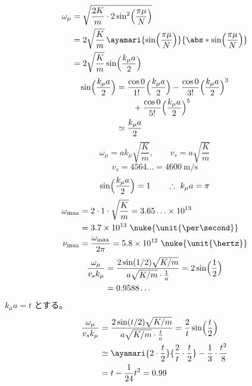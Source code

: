 \begin{align*}
  \omega_\mu&=\sqrt{\frac{2K}{m}\cdot2\sin^{2}\Bigl(\frac{\pi\mu}{N}\Bigr)}\\
  &=2\sqrt{\frac{K}{m}}\,\ayamari{\sin\Bigl(\frac{\pi\mu}{N}\Bigr)}{\abs*{\sin\Bigl(\frac{\pi\mu}{N}\Bigr)}}\\
  &=2\sqrt{\frac{K}{m}}\sin\Bigl(\frac{k_\mu a}{2}\Bigr)
\end{align*}
\begin{align*}
  \sin\Bigl(\frac{k_\mu a}{2}\Bigr)&=\frac{\cos0}{1!}\Bigl(\frac{k_\mu a}{2}\Bigr)-\frac{\cos0}{3!}\Bigl(\frac{k_\mu a}{2}\Bigr)^{3}\\
  &\qquad+\frac{\cos0}{5!}\Bigl(\frac{k_\mu a}{2}\Bigr)^{5}\\
  &\simeq\frac{k_\mu a}{2}
\end{align*}
\[ \omega_\mu=ak_\mu\sqrt{\frac{K}{m}},\qquad v_s=a\sqrt{\frac{K}{m}} \]
\[ v_s=4564\ldots=\qty{4600}{\metre\per\second} \]
\[ \sin\Bigl(\frac{k_\mu a}{2}\Bigr)=1\qquad\therefore\ k_\mu a=\pi \]
\begin{align*}
  \omega_{\max}&=2\cdot1\cdot\sqrt{\frac{K}{m}}=3.65\ldots\times10^{13}\\
  &=3.7\times10^{13}\ \nuke{\unit{\per\second}}\\
  \nu_{\max}&=\frac{\omega_{\max}}{2\pi}=5.8\times10^{12}\ \nuke{\unit{\hertz}}
\end{align*}
\begin{align*}
  \frac{\omega_\mu}{v_sk_\mu}&=\frac{2\sin(1/2)\sqrt{K/m}}{a\sqrt{K/m}\cdot\frac{1}{a}}=2\sin\Bigl(\frac{1}{2}\Bigr)\\
  &=0.9588\ldots
\end{align*}
$k_\mu a=t$ とする。
\begin{align*}
  \frac{\omega_\mu}{v_sk_\mu}&=\frac{2\sin(t/2)\sqrt{K/m}}{a\sqrt{K/m}\cdot\frac{t}{a}}=\frac{2}{t}\sin\Bigl(\frac{t}{2}\Bigr)\\
  &\simeq\ayamari{2\cdot\frac{t}{2}}{\frac{2}{t}\cdot\frac{t}{2}}-\frac{1}{3}\cdot\frac{t^{2}}{8}\\
  &=t-\frac{1}{24}t^{2}=0.99
\end{align*}
